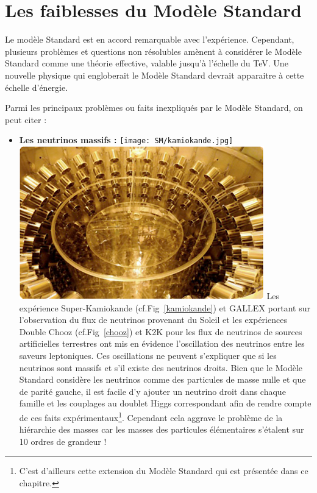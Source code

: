 \section{Les faiblesses du Modèle Standard}
\vspace*{-0.5cm}
Le modèle Standard est en accord remarquable avec l'expérience. Cependant, plusieurs problèmes et questions non résolubles amènent à considérer le Modèle Standard comme une théorie effective, valable jusqu'à l'échelle du \si{\tera\eV}. Une nouvelle physique qui engloberait le Modèle Standard devrait apparaitre à cette échelle d'énergie.

Parmi les principaux problèmes ou faits inexpliqués par le Modèle Standard, on peut citer :
\begin{itemize}[label=$\bullet$]
\item \textbf{Les neutrinos massifs :}
\marginpar
{
\centering
\texttt{[image: SM/kamiokande.jpg]}
\label{kamiokande}
}
\marginpar
{
\centering
\includegraphics[width=\marginparwidth]{SM/chooz.jpg}
\label{chooz}
} 
Les expérience Super-Kamiokande (cf.Fig~\ref{kamiokande}) et GALLEX portant sur l'observation du flux de neutrinos provenant du Soleil et les expériences Double Chooz (cf.Fig~\ref{chooz}) et K2K pour les flux de neutrinos de sources artificielles terrestres ont mis en évidence l'oscillation des neutrinos entre les saveurs leptoniques. Ces oscillations ne peuvent s'expliquer que si les neutrinos sont massifs et s'il existe des neutrinos droits. Bien que le Modèle Standard considère les neutrinos comme des particules de masse nulle et que de parité gauche, il est facile d'y ajouter un neutrino droit dans chaque famille et les couplages au doublet Higgs correspondant afin de rendre compte de ces faits expérimentaux\footnote{C'est d'ailleurs cette extension du Modèle Standard qui est présentée dans ce chapitre.}. Cependant cela aggrave le problème de la hiérarchie des masses car les masses des particules élémentaires s'étalent sur \num{10} ordres de grandeur !


\end{itemize}
